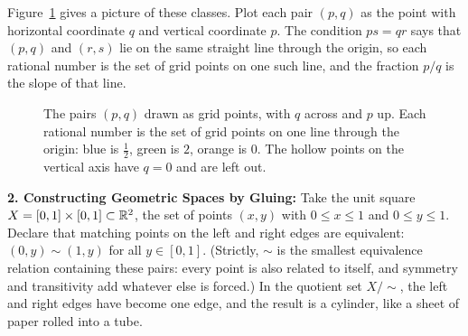 Figure~\ref{15:fig-rational-lines} gives a picture of these classes. Plot each pair $(p, q)$ as the point with horizontal coordinate $q$ and vertical coordinate $p$. The condition $ps = qr$ says that $(p, q)$ and $(r, s)$ lie on the same straight line through the origin, so each rational number is the set of grid points on one such line, and the fraction $p/q$ is the slope of that line.

\begin{figure}[htbp]
\centering
{}
\caption{The pairs $(p, q)$ drawn as grid points, with $q$ across and $p$ up. Each rational number is the set of grid points on one line through the origin: blue is $\tfrac12$, green is $2$, orange is $0$. The hollow points on the vertical axis have $q = 0$ and are left out.}
\label{15:fig-rational-lines}
\end{figure}

\textbf{2. Constructing Geometric Spaces by Gluing:}
Take the unit square $X = [0, 1] \times [0, 1] \subset \mathbb{R}^2$, the set of points $(x, y)$ with $0 \le x \le 1$ and $0 \le y \le 1$.
Declare that matching points on the left and right edges are equivalent: $(0, y) \sim (1, y)$ for all $y \in [0, 1]$. (Strictly, $\sim$ is the smallest equivalence relation containing these pairs: every point is also related to itself, and symmetry and transitivity add whatever else is forced.) In the quotient set $X / \!\sim$, the left and right edges have become one edge, and the result is a cylinder, like a sheet of paper rolled into a tube.

